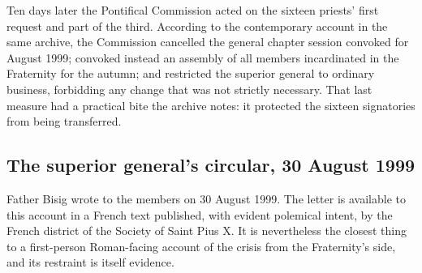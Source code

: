 Ten days later the Pontifical Commission acted on the sixteen priests'
first request and part of the third. According to the contemporary
account in the same archive, the Commission cancelled the general chapter
session convoked for August 1999; convoked instead an assembly of all
members incardinated in the Fraternity for the autumn; and restricted the
superior general to ordinary business, forbidding any change that was not
strictly necessary. That last measure had a practical bite the archive
notes: it protected the sixteen signatories from being
transferred.

\subsection{The superior general's circular, 30 August 1999}

Father Bisig wrote to the members on 30 August 1999. The letter is
available to this account in a French text published, with evident
polemical intent, by the French district of the Society of Saint Pius X.
It is nevertheless the closest thing to a first-person Roman-facing
account of the crisis from the Fraternity's side, and its restraint is
itself evidence.

